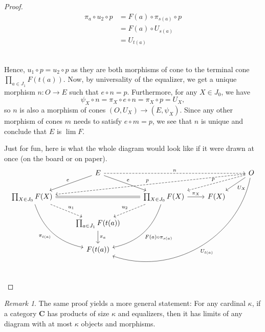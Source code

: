 \documentclass{article}
\theoremstyle{definition}
\theoremstyle{remark}
\newtheorem{rem}[thm]{Remark}
\begin{document}
\begin{proof}
    \begin{minipage}{0.45\textwidth}
    \begin{align*}
        \pi_a \circ u_2 \circ p &= F(a) \circ \pi_{s(a)} \circ p\\
        &= F(a) \circ U_{s(a)}\\
        &= U_{t(a)}
    \end{align*}
    \end{minipage}\vspace{1em}
    \\ 
    Hence, $u_1 \circ p = u_2 \circ p$ as they are both morphisms of cone to the terminal cone $\prod_{a \in J_1} F(t(a))$. Now, by universality of the equalizer, we get a unique morphism $n: O\rightarrow E$ such that $e \circ n = p$. Furthermore, for any $X \in J_0$, we have \[\psi_X \circ n = \pi_X \circ e \circ n = \pi_X \circ p = U_X,\]
    so $n$ is also a morphism of cones $(O, U_X)\rightarrow (E, \psi_X)$. Since any other morphism of cones $m$ needs to satisfy $e \circ m = p$, we see that $n$ is unique and conclude that $E$ is $\lim F$.

    Just for fun, here is what the whole diagram would look like if it were drawn at once (on the board or on paper).
    \begin{equation*}
        \begin{tikzcd}
            & E \arrow[ld, "e"'] \arrow[rd, "e"] \arrow[rrr, "n", dashed] &   &   & O \arrow[ld, "U_X"] \arrow[lllddd, "U_{t(a)}", bend left=49] \arrow[lld, "p"', dashed] \arrow[lllld, "p"', dashed] \\
\prod_{X \in J_0} F(X) \arrow[rdd, "\pi_{t(a)}"', bend right] \arrow[rd, "u_1", dashed] \arrow[rr, equal] &  & \prod_{X \in J_0} F(X) \arrow[ldd, "F(a) \circ \pi_{s(a)}", bend left] \arrow[ld, "u_2"', dashed] \arrow[r, "\pi_X"] & F(X) &  \\
            & \prod_{a \in J_1} F(t(a)) \arrow[d, "\pi_{a}"] &  & &\\
            & F(t(a))& & &     
\end{tikzcd}
    \end{equation*}
\end{proof}
\begin{rem}
    The same proof yields a more general statement: For any cardinal $\kappa$, if a category $\mathbf{C}$ has products of size $\kappa$ and equalizers, then it has limits of any diagram with at most $\kappa$ objects and morphisms. 
\end{rem}
\end{document}
